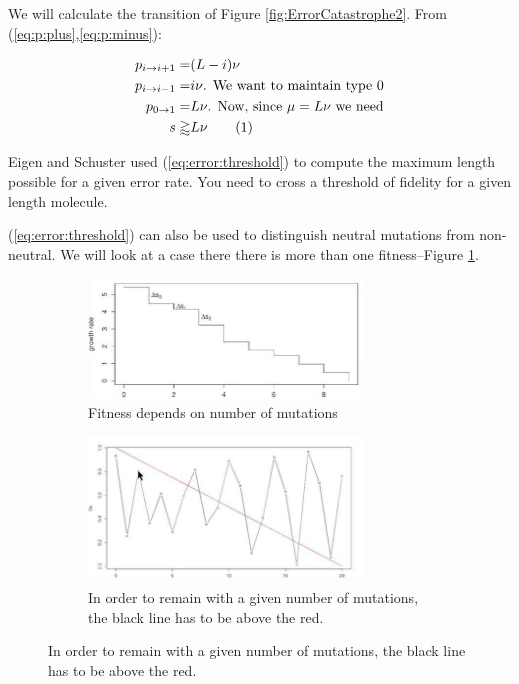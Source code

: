 \documentclass[]{article}
\newcommand\numberthis{\addtocounter{equation}{1}\tag{\theequation}}
\begin{document}
We will calculate the transition of Figure \ref{fig:ErrorCatastrophe2}. From (\ref{eq:p:plus},\ref{eq:p:minus}):

\begin{align*}
	p_{i\rightarrow i+1} =& (L-i)\nu \\
	p_{i \rightarrow i-1}=& i\nu \text{. We want to maintain type $0$}\\
	p_{0\rightarrow 1} =& L \nu \text{. Now, since $\mu = L \nu$ we need}\\
	s \gtrapprox& L\nu \numberthis \label{eq:error:threshold}
\end{align*}

Eigen and Schuster used (\ref{eq:error:threshold}) to compute the maximum length possible for a given error rate. You need to cross a threshold of fidelity for a given length molecule.

(\ref{eq:error:threshold}) can also be used to distinguish neutral mutations from non-neutral. We will look at a case there there is more than one fitness--Figure \ref{fig:fitness-stairs}.

\begin{figure}[H]
	\caption{Distinguishing neutral mutations from non-neutral}
	\begin{subfigure}[t]{0.45\textwidth}
		\caption{Fitness depends on number of mutations}\label{fig:fitness-stairs}
		\includegraphics[width=0.8\textwidth]{fitness-stairs}
	\end{subfigure}
	\begin{subfigure}[t]{0.45\textwidth}
		\caption{In order to remain with a given number of mutations, the black line has to be above the red.}\label{fig:neutral-mutations}
		\includegraphics[width=0.8\textwidth]{neutral-mutations}
	\end{subfigure}
\end{figure}
\end{document}
